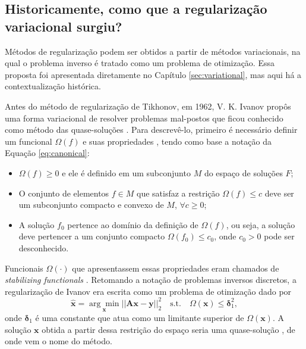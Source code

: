 \subsection{Historicamente, como que a regularização variacional surgiu?}\label{sec:history}

Métodos de regularização podem ser obtidos a partir de métodos variacionais, na qual o problema inverso é tratado como um problema de otimização. Essa proposta foi apresentada diretamente no Capítulo \ref{sec:variational}, mas aqui há a contextualização histórica.

Antes do método de regularização de Tikhonov, em 1962, V. K. Ivanov propôs uma forma variacional de resolver problemas mal-postos que ficou conhecido como método das quase-soluções \cite{ivanov2002}. Para descrevê-lo, primeiro é necessário definir um funcional $\Omega(f)$ e suas propriedades \cite[págs. 418-9]{Vapnik2006}, tendo como base a notação da Equação \eqref{eq:canonical}:
\begin{itemize}
\item $\Omega(f) \geq 0$ e ele é definido em um subconjunto $M$ do espaço de soluções $F$;
\item O conjunto de elementos $f \in M$ que satisfaz a restrição $\Omega(f)\leq c$ deve ser um subconjunto compacto e convexo de $M$, $\forall c \geq0$;
\item A solução $f_0$ pertence ao domínio da definição de $\Omega(f)$, ou seja, a solução deve pertencer a um conjunto compacto $\Omega(f_0)\leq c_0$, onde $c_0 > 0$ pode ser desconhecido. 
\end{itemize}
Funcionais $\Omega(\cdot)$ que apresentassem essas propriedades eram chamados de \textit{stabilizing functionals} \cite[pág. 51]{tikhonov1977solutions}. Retomando a notação de problemas inversos discretos, a regularização de Ivanov era escrita como um problema de otimização dado por
\begin{equation}
\hat{\mathbf{x}} = \underset{\mathbf{x}}{\arg\min} \vert \vert \mathbf{A}\mathbf{x} - \mathbf{y} \vert \vert^2_2\quad \text{s.t.}\quad \Omega(\mathbf{x}) \leq \bm{\delta}^2_1,
\label{eq:ivanov}
\end{equation}
onde $\bm{\delta}_1$ é uma constante que atua como um limitante superior de $\Omega(\mathbf{x})$. A solução $\mathbf{x}$ obtida a partir dessa restrição do espaço seria uma quase-solução \cite[pág. 19]{baumeister2005topics}, de onde vem o nome do método. 


